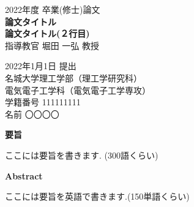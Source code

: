 \documentclass[12pt,a4j]{jreport}
\begin{document}
\renewcommand{\baselinestretch}{1.2}



\thispagestyle{empty}
\begin{center}

\vspace{40mm}
{\huge\noindent 2022年度 卒業(修士)論文}\\
\vspace{20mm}
{\huge\noindent\textbf{論文タイトル}}\\
\medskip
{\huge\noindent\textbf{論文タイトル(２行目)}}\\
\vspace{\baselineskip}
\vspace{20mm}
{\huge\noindent 指導教官 堀田 一弘 教授}\\
\vspace{20mm}

{\LARGE\noindent
2022年1月1日 提出\\
\vspace{\baselineskip}
名城大学理工学部（理工学研究科）\\
電気電子工学科（電気電子工学専攻） \\
学籍番号 111111111 \\
名前 〇〇〇〇\\
}
\vspace{40mm}

\end{center}

\thispagestyle{empty}
\clearpage




\thispagestyle{empty}

\begin{center}
\vspace{10mm}
{\LARGE\noindent\textbf{要旨}}\\
\end{center}
\vspace{10mm}
{\large\noindent ここには要旨を書きます. (300語くらい)}\\
\medskip

\begin{center}
\vspace{10mm}
{\LARGE\noindent\textbf{Abstract}}\\
\end{center}
\vspace{10mm}
{\large\noindent ここには要旨を英語で書きます.(150単語くらい)}\\
\end{document}
